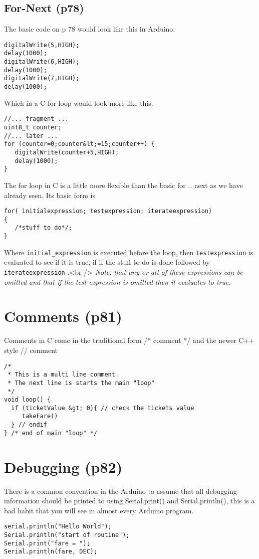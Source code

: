 \documentclass{book}
\begin{document}
\subsection{For-Next (p78)}
The basic code on p 78 would look like this in Arduino.
\begin{verbatim}
digitalWrite(5,HIGH);
delay(1000);
digitalWrite(6,HIGH);
delay(1000);
digitalWrite(7,HIGH);
delay(1000);
\end{verbatim}

Which in a C for loop would look more like this.
\begin{verbatim}
//... fragment ...
uint8_t counter;
//... later ...
for (counter=0;counter&lt;=15;counter++) {
   digitalWrite(counter+5,HIGH);
   delay(1000);
}
\end{verbatim}

The for loop in C is a little more flexible than the basic for .. next as we have already seen.
Its basic form is
\begin{verbatim}
for( initialexpression; testexpression; iterateexpression)
{
   /*stuff to do*/;
}
\end{verbatim}

Where \verb|initial_expression| is executed before the loop, then \verb|testexpression| is evaluated to see if it is true, if if the stuff to do is done followed by \verb|iterateexpression| .<br />
\emph{Note: that any or all of these expressions can be omitted and that if the test expression is omitted then it evaluates to true.}
\section{Comments (p81)}

Comments in C come in the traditional form /* comment */ and the newer C++ style // comment
\begin{verbatim}
/*
 * This is a multi line comment. 
 * The next line is starts the main "loop"
 */
void loop() {
  if (ticketValue &gt; 0){ // check the tickets value
     takeFare()
  } // endif
} /* end of main "loop" */

\end{verbatim}
\section{Debugging (p82)}

There is a common convention in the Arduino to assume that all debugging information should be printed to using Serial.print() and Serial.println(), this is a bad habit that you will see in almost every Arduino program.
\begin{verbatim}
serial.println("Hello World");
Serial.println("start of routine");
Serial.print("fare = ");
Serial.println(fare, DEC);
\end{verbatim}
\end{document}
